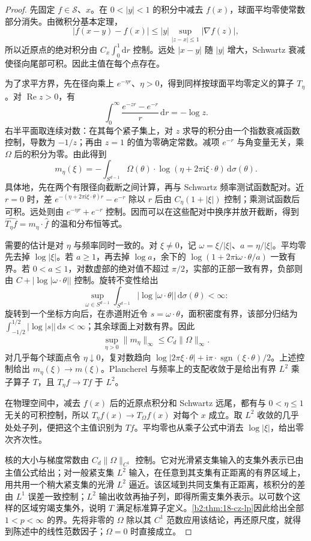 \begin{proof}
先固定 \(f\in\mathcal S\)、\(x\)。在 \(0<|y|<1\) 的积分中减去 \(f(x)\)，球面平均零使常数部分消失。由微积分基本定理，
\[
 |f(x-y)-f(x)|\leq |y|\sup_{|z-x|\leq1}|\nabla f(z)|,
\]
所以近原点的绝对积分由 \(C_x\int_0^1\mathrm dr\) 控制。远处 \(|x-y|\) 随 \(|y|\) 增大，Schwartz 衰减使径向尾部可积。因此主值在每个点存在。

为了求平方界，先在径向乘上 \(e^{-\eta r}\)、\(\eta>0\)，得到同样按球面平均零定义的算子 \(T_\eta\)。对 \(\operatorname{Re}z>0\)，有
\[
 \int_0^\infty\frac{e^{-zr}-e^{-r}}r\,\mathrm dr=-\log z.
\]
右半平面取连续对数：在其每个紧子集上，对 \(z\) 求导的积分由一个指数衰减函数控制，导数为 \(-1/z\)；再由 \(z=1\) 的值为零确定常数。减项 \(e^{-r}\) 与角变量无关，乘 \(\Omega\) 后的积分为零。由此得到
\[
 m_\eta(\xi)=-\int_{S^{d-1}}\Omega(\theta)\cdot
                  \log(\eta+2\pi\mathrm i\xi\cdot\theta)\,\mathrm d\sigma(\theta).
\]
具体地，先在两个有限径向截断之间计算，再与 Schwartz 频率测试函数配对。近 \(r=0\) 时，差
\(e^{-(\eta+2\pi\mathrm i\xi\cdot\theta)r}-e^{-r}\)
除以 \(r\) 后由 \(C_\eta(1+|\xi|)\) 控制；乘测试函数后可积。远处则由 \(e^{-\eta r}+e^{-r}\) 控制。因而可以在这些配对中换序并放开截断，得到 \(\widehat{T_\eta f}=m_\eta\cdot\widehat f\) 的温和分布恒等式。

需要的估计是对 \(\eta\) 与频率同时一致的。对 \(\xi\ne0\)，记 \(\omega=\xi/|\xi|\)、\(a=\eta/|\xi|\)。平均零先去掉 \(\log|\xi|\)。若 \(a\geq1\)，再去掉 \(\log a\)，余下的 \(\log(1+2\pi\mathrm i\omega\cdot\theta/a)\) 一致有界。若 \(0<a\leq1\)，对数虚部的绝对值不超过 \(\pi/2\)，实部的正部一致有界，负部则由
\(C+\bigl|\log|\omega\cdot\theta|\bigr|\) 控制。旋转不变性给出
\[
 \sup_{\omega\in S^{d-1}}
 \int_{S^{d-1}}\bigl|\log|\omega\cdot\theta|\bigr|\,\mathrm d\sigma(\theta)<\infty:
\]
旋转到一个坐标方向后，在赤道附近令 \(s=\omega\cdot\theta\)，面积密度有界，该部分归结为
\(\int_{-1/2}^{1/2}\bigl|\log|s|\bigr|\,\mathrm ds<\infty\)；其余球面上对数有界。因此
\[
 \sup_{\eta>0}\|m_\eta\|_\infty\leq C_d\|\Omega\|_\infty.
\]
对几乎每个球面点令 \(\eta\downarrow0\)，复对数趋向
\(\log|2\pi\xi\cdot\theta|+\mathrm i\pi\cdot\operatorname{sgn}(\xi\cdot\theta)/2\)。上述控制给出 \(m_\eta(\xi)\to m(\xi)\)。Plancherel 与频率上的支配收敛于是给出有界 \(L^2\) 乘子算子 \(T\)，且 \(T_\eta f\to Tf\) 于 \(L^2\)。

在物理空间中，减去 \(f(x)\) 后的近原点积分和 Schwartz 远尾，都有与 \(0<\eta\leq1\) 无关的可积控制，所以 \(T_\eta f(x)\to T_\Omega f(x)\) 对每个 \(x\) 成立。取 \(L^2\) 收敛的几乎处处子列，便把这个主值识别为 \(Tf\)。平均零也从乘子公式中消去 \(\log|\xi|\)，给出零次齐次性。

核的大小与梯度常数由 \(C_d\|\Omega\|_{C^1}\) 控制。它对光滑紧支集输入的支集外表示已由主值公式给出；对一般紧支集 \(L^2\) 输入，在任意到其支集有正距离的有界区域上，用共用一个稍大紧支集的光滑 \(L^2\) 逼近。该区域到共同支集有正距离，核积分的差由 \(L^1\) 误差一致控制；\(L^2\) 输出收敛再抽子列，即得所需支集外表示。以可数个这样的区域穷竭支集外，说明 \(T\) 满足标准算子定义。\cref{b2:thm:18-cz-lp}因此给出全部 \(1<p<\infty\) 的界。先将非零的 \(\Omega\) 除以其 \(C^1\) 范数应用该结论，再还原尺度，就得到陈述中的线性范数因子；\(\Omega=0\) 时直接成立。
\end{proof}

